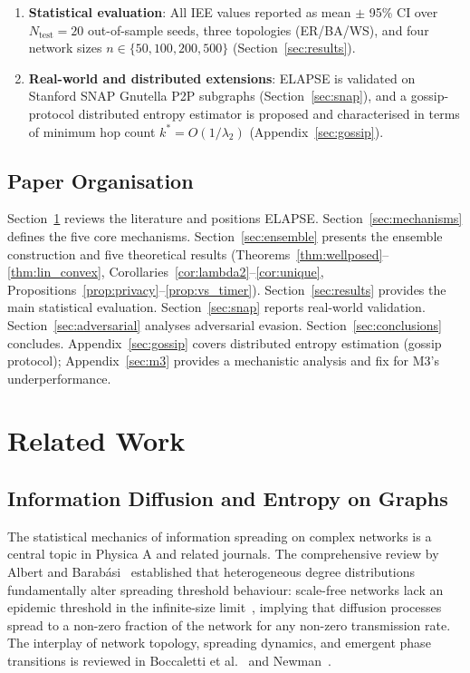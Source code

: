 \documentclass[review,12pt]{elsarticle}
\begin{document}
\begin{enumerate}
        spectral trigger time prediction $\tau \sim \lambda_2^{-1}$
        (Section~\ref{sec:scaling_laws}).
  \item \textbf{Statistical evaluation}: All IEE values reported as
        mean $\pm$ 95\% CI over $N_{\mathrm{test}} = 20$ out-of-sample seeds,
        three topologies (ER/BA/WS), and four network sizes
        $n \in \{50, 100, 200, 500\}$ (Section~\ref{sec:results}).
  \item \textbf{Real-world and distributed extensions}: ELAPSE is validated
        on Stanford SNAP Gnutella P2P subgraphs (Section~\ref{sec:snap}),
        and a gossip-protocol distributed entropy estimator is proposed and
        characterised in terms of minimum hop count $k^* = O(1/\lambda_2)$
        (Appendix~\ref{sec:gossip}).
\end{enumerate}

\subsection{Paper Organisation}

Section~\ref{sec:related} reviews the literature and positions ELAPSE.
Section~\ref{sec:mechanisms} defines the five core mechanisms.
Section~\ref{sec:ensemble} presents the ensemble construction and five
theoretical results (Theorems~\ref{thm:wellposed}--\ref{thm:lin_convex},
Corollaries~\ref{cor:lambda2}--\ref{cor:unique},
Propositions~\ref{prop:privacy}--\ref{prop:vs_timer}).
Section~\ref{sec:results} provides the main statistical evaluation.
Section~\ref{sec:snap} reports real-world validation.
Section~\ref{sec:adversarial} analyses adversarial evasion.
Section~\ref{sec:conclusions} concludes.
Appendix~\ref{sec:gossip} covers distributed entropy estimation
(gossip protocol); Appendix~\ref{sec:m3} provides a mechanistic
analysis and fix for M3's underperformance.

\section{Related Work}
\label{sec:related}

\subsection{Information Diffusion and Entropy on Graphs}

The statistical mechanics of information spreading on complex networks is
a central topic in Physica A and related journals.
The comprehensive review by Albert and Barab\'asi~\cite{albert2002statistical}
established that heterogeneous degree distributions fundamentally alter
spreading threshold behaviour: scale-free networks lack an epidemic threshold
in the infinite-size limit~\cite{pastor2001epidemic}, implying that diffusion
processes spread to a non-zero fraction of the network for any non-zero
transmission rate.  The interplay of network topology, spreading dynamics,
and emergent phase transitions is reviewed in
Boccaletti et al.~\cite{boccaletti2006complex} and
Newman~\cite{newman2003structure}.
\end{document}
